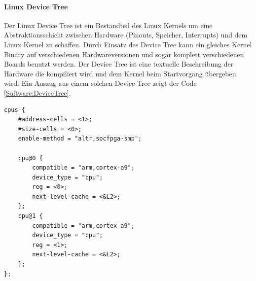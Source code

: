 \paragraph{Linux Device Tree} Der Linux Device Tree ist ein Bestandteil des Linux Kernels um eine Abstraktionsschicht zwischen Hardware (Pinouts, Speicher, Interrupts) und dem Linux Kernel zu schaffen. Durch Einsatz des Device Tree kann ein gleiches Kernel Binary auf verschiedenen Hardwareversionen und sogar komplett verschiedenen Boards benutzt werden. Der Device Tree ist eine textuelle Beschreibung der Hardware die kompiliert wird und dem Kernel beim Startvorgang übergeben wird. Ein Auszug aus einem solchen Device Tree zeigt der Code \ref{Software:DeviceTree}.

\begin{lstlisting}[caption={[Auszug aus socfpga.dtsi]Auszug aus socfpga.dtsi \cite[Version~4.7, \texttt{arch/arm/boot/dts/socfpga.dtsi}]{Linux_Kernel}}, label=Software:DeviceTree]
cpus {
	#address-cells = <1>;
	#size-cells = <0>;
	enable-method = "altr,socfpga-smp";
	
	cpu@0 {
		compatible = "arm,cortex-a9";
		device_type = "cpu";
		reg = <0>;
		next-level-cache = <&L2>;
	};
	cpu@1 {
		compatible = "arm,cortex-a9";
		device_type = "cpu";
		reg = <1>;
		next-level-cache = <&L2>;
	};
};
\end{lstlisting}

